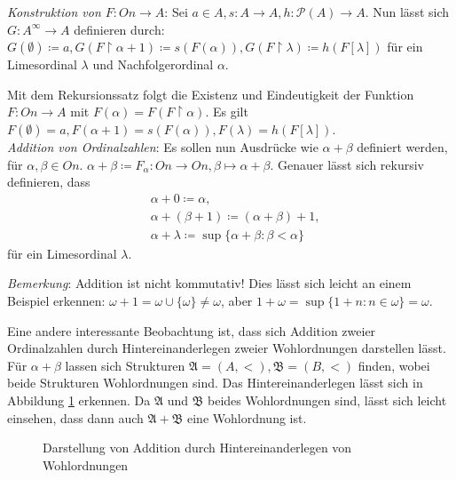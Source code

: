 \documentclass[german]{article}
\theoremstyle{break}
\theoremstyle{def_style}
\theoremstyle{def_style}
\theoremstyle{lemma_style}
\newcommand{\Pot}[1]{\mathcal{P}(#1)}
\begin{document}
\textit{Konstruktion von $F:On\to A$}: Sei $a\in A,s:A\to A, h: \Pot{A}\to A$. Nun lässt sich $G:A^\infty\to A$ definieren durch: $G(\emptyset)\coloneqq a, G(F\upharpoonright\alpha+1)\coloneqq s(F(\alpha)), G(F\upharpoonright\lambda)\coloneqq h(F[\lambda])$ für ein Limesordinal $\lambda$ und Nachfolgerordinal $\alpha$.

Mit dem Rekursionssatz folgt die Existenz und Eindeutigkeit der Funktion $F:On\to A$ mit $F(\alpha)=F(F\upharpoonright\alpha)$. Es gilt $F(\emptyset)=a, F(\alpha+1)=s(F(\alpha)), F(\lambda)=h(F[\lambda])$.\\

\textit{Addition von Ordinalzahlen}: Es sollen nun Ausdrücke wie $\alpha+\beta$ definiert werden, für $\alpha,\beta\in On$. $\alpha+\beta\coloneqq F_\alpha:On\to On, \beta\mapsto\alpha+\beta$. 
Genauer lässt sich rekursiv definieren, dass 
\begin{align*}
	&\alpha+0\coloneqq\alpha,\\
	&\alpha+(\beta+1)\coloneqq(\alpha+\beta)+1,\\ 
	&\alpha+\lambda\coloneqq\sup\{\alpha+\beta : \beta < \alpha\}
\end{align*}
für ein Limesordinal $\lambda$.

\textit{Bemerkung}: Addition ist nicht kommutativ! Dies lässt sich leicht an einem Beispiel erkennen: $\omega+1=\omega\cup\{\omega\}\neq\omega$, aber $1+\omega=\sup\{1+n:n\in\omega\}=\omega$.

Eine andere interessante Beobachtung ist, dass sich Addition zweier Ordinalzahlen durch \glqq Hintereinanderlegen\grqq{} zweier Wohlordnungen darstellen lässt. Für $\alpha+\beta$ lassen sich Strukturen $\mathfrak{A}=(A,<), \mathfrak{B}=(B,<)$ finden, wobei beide Strukturen Wohlordnungen sind. Das \glqq Hintereinanderlegen\grqq{} lässt sich in Abbildung \ref{AdditionWO} erkennen. Da $\mathfrak{A}$ und $\mathfrak{B}$ beides Wohlordnungen sind, lässt sich leicht einsehen, dass dann auch $\mathfrak{A}+\mathfrak{B}$ eine Wohlordnung ist.
	
\begin{figure}[h]
	\begin{center}
	\end{center}
	\caption{Darstellung von Addition durch \glqq Hintereinanderlegen\grqq{} von Wohlordnungen}
	\label{AdditionWO}
\end{figure}
\end{document}
